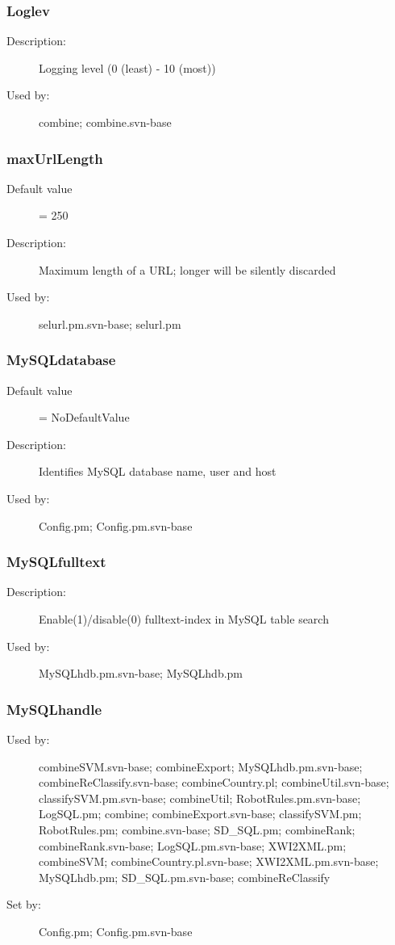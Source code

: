 \subsubsection{Loglev}
\label{Loglev}
\begin{description}
\item[Description:] Logging level (0 (least) - 10 (most))
\item[Used by:] combine; combine.svn-base
\end{description}
\subsubsection{maxUrlLength}
\label{maxUrlLength}
\begin{description}
\item[Default value] = 250
\item[Description:] Maximum length of a URL; longer will be silently discarded
\item[Used by:] selurl.pm.svn-base; selurl.pm
\end{description}
\subsubsection{MySQLdatabase}
\label{MySQLdatabase}
\begin{description}
\item[Default value] = NoDefaultValue
\item[Description:] Identifies MySQL database name, user and host
\item[Used by:] Config.pm; Config.pm.svn-base
\end{description}
\subsubsection{MySQLfulltext}
\label{MySQLfulltext}
\begin{description}
\item[Description:] Enable(1)/disable(0) fulltext-index in MySQL table search
\item[Used by:] MySQLhdb.pm.svn-base; MySQLhdb.pm
\end{description}
\subsubsection{MySQLhandle}
\label{MySQLhandle}
\begin{description}
\item[Used by:] combineSVM.svn-base; combineExport; MySQLhdb.pm.svn-base; combineReClassify.svn-base; combineCountry.pl; combineUtil.svn-base; classifySVM.pm.svn-base; combineUtil; RobotRules.pm.svn-base; LogSQL.pm; combine; combineExport.svn-base; classifySVM.pm; RobotRules.pm; combine.svn-base; SD\_SQL.pm; combineRank; combineRank.svn-base; LogSQL.pm.svn-base; XWI2XML.pm; combineSVM; combineCountry.pl.svn-base; XWI2XML.pm.svn-base; MySQLhdb.pm; SD\_SQL.pm.svn-base; combineReClassify
\item[Set by:] Config.pm; Config.pm.svn-base
\end{description}

